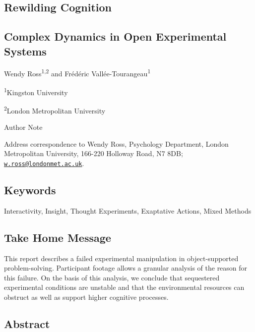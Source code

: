 \hypertarget{rewilding-cognition}{%
\subsection{Rewilding Cognition}\label{rewilding-cognition}}

\hypertarget{complex-dynamics-in-open-experimental-systems}{%
\subsection{Complex Dynamics in Open Experimental
Systems}\label{complex-dynamics-in-open-experimental-systems}}

Wendy Ross\textsuperscript{1,2} and Frédéric
Vallée-Tourangeau\textsuperscript{1}

\textsuperscript{1}Kingston University

\textsuperscript{2}London Metropolitan University

Author Note

Address correspondence to Wendy Ross, Psychology Department, London
Metropolitan University, 166-220 Holloway Road, N7 8DB;
\href{mailto:w.ross@londonmet.ac.uk}{\nolinkurl{w.ross@londonmet.ac.uk}}.

\hypertarget{keywords}{%
\subsection{\texorpdfstring{Keywords }{Keywords }}\label{keywords}}

Interactivity, Insight, Thought Experiments, Exaptative Actions, Mixed
Methods

\hypertarget{take-home-message}{%
\subsection{\texorpdfstring{Take Home Message
}{Take Home Message }}\label{take-home-message}}

This report describes a failed experimental manipulation in
object-supported problem-solving. Participant footage allows a granular
analysis of the reason for this failure. On the basis of this analysis,
we conclude that sequestered experimental conditions are unstable and
that the environmental resources can obstruct as well as support higher
cognitive processes.

\hypertarget{abstract}{%
\subsection{Abstract}\label{abstract}}

